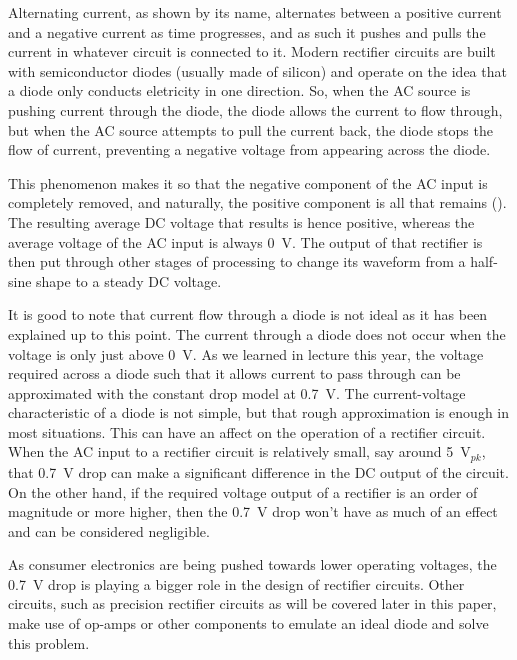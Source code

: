 
Alternating current, as shown by its name, alternates
between a positive current and a negative current as
time progresses, and as such it pushes and pulls the
current in whatever circuit is connected to it. Modern
rectifier circuits are built with semiconductor diodes
(usually made of silicon) and operate on the idea that
a diode only conducts eletricity in one direction. So,
when the AC source is pushing current through the diode,
the diode allows the current to flow through, but when
the AC source attempts to pull the current back, the
diode stops the flow of current, preventing a negative
voltage from appearing across the diode.

This phenomenon makes it so that the negative component
of the AC input is completely removed, and naturally,
the positive component is all that remains (\cite{sinclair1987electronics}).
The resulting average DC voltage that results is hence
positive, whereas the average voltage of the AC input
is always 0~V. The output of that rectifier is then
put through other stages of processing to change its
waveform from a half-sine shape to a steady DC voltage.

It is good to note that current flow through a diode
is not ideal as it has been explained up to this point.
The current through a diode does not occur when the
voltage is only just above 0~V. As we learned in lecture
this year, the voltage required across a diode such
that it allows current to pass through can be approximated
with the constant drop model at 0.7~V. The current-voltage
characteristic of a diode is not simple, but that rough
approximation is enough in most situations. This can
have an affect on the operation of a rectifier circuit.
When the AC input to a rectifier circuit is relatively
small, say around 5~V$_{pk}$, that 0.7~V drop can make
a significant difference in the DC output of the circuit.
On the other hand, if the required voltage output of
a rectifier is an order of magnitude or more higher,
then the 0.7~V drop won't have as much of an effect
and can be considered negligible.

As consumer electronics are being pushed towards lower
operating voltages, the 0.7~V drop is playing a bigger
role in the design of rectifier circuits. Other circuits,
such as precision rectifier circuits as will be covered
later in this paper, make use of op-amps or other components
to emulate an ideal diode and solve this problem.

